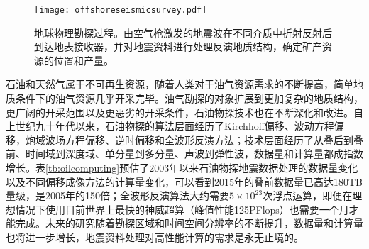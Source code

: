 \begin{figure}[t]
  \centering
  \texttt{[image: offshoreseismicsurvey.pdf]}
  \caption{地球物理勘探过程。由空气枪激发的地震波在不同介质中折射反射后到达地表接收器，并对地震资料进行处理反演地质结构，确定矿产资源的位置和产量。}
  \label{fig:offshoreseismicsurvey}
\end{figure}

石油和天然气属于不可再生资源，随着人类对于油气资源需求的不断提高，简单地质条件下的油气资源几乎开采完毕。油气勘探的对象扩展到更加复杂的地质结构，更广阔的开采范围以及更恶劣的开采条件，石油物探技术也在不断深化和改进。自上世纪九十年代以来，石油物探的算法层面经历了Kirchhoff偏移\cite{yilmaz2001seismic}、波动方程偏移\cite{rickett2002offset}，炮域波场方程偏移\cite{zhang2005theory}、逆时偏移\cite{baysal1983reverse}和全波形反演方法\cite{tarantola1984inversion}；技术层面经历了从叠后到叠前、时间域到深度域、单分量到多分量、声波到弹性波，数据量和计算量都成指数增长\cite{赵改善2009高性能计算在石油物探中的应用现状与前景}。表\ref{tb:oilcomputing}预估了2003年以来石油物探地震数据处理的数据量变化以及不同偏移成像方法的计算量变化\cite{赵改善2009高性能计算在石油物探中的应用现状与前景}，可以看到2015年的叠前数据量已高达180TB量级，是2005年的150倍；全波形反演算法大约需要$5\times10^{23}$次浮点运算，即便在理想情况下使用目前世界上最快的神威超算（峰值性能125PFlops）也需要一个月才能完成。未来的研究随着勘探区域和时间空间分辨率的不断提升，数据量和计算量也将进一步增长，地震资料处理对高性能计算的需求是永无止境的。

